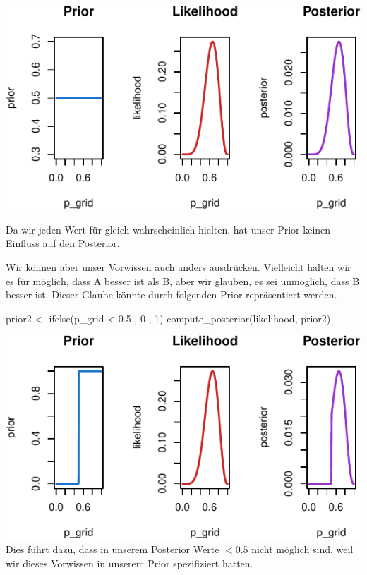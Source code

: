\documentclass[]{tufte-handout}
\newenvironment{Shaded}{}{}
\newcommand{\DecValTok}[1]{\textcolor[rgb]{0.25,0.63,0.44}{#1}}
\newcommand{\FloatTok}[1]{\textcolor[rgb]{0.25,0.63,0.44}{#1}}
\newcommand{\FunctionTok}[1]{\textcolor[rgb]{0.02,0.16,0.49}{#1}}
\newcommand{\NormalTok}[1]{#1}
\newcommand{\OtherTok}[1]{\textcolor[rgb]{0.00,0.44,0.13}{#1}}
\newcommand{\SpecialCharTok}[1]{\textcolor[rgb]{0.25,0.44,0.63}{#1}}
\begin{document}
\includegraphics{01-intro-bayesian-stats_files/figure-latex/unnamed-chunk-17-1}

Da wir jeden Wert für gleich wahrscheinlich hielten, hat unser Prior
keinen Einfluss auf den Posterior.

Wir können aber unser Vorwissen auch anders ausdrücken. Vielleicht
halten wir es für möglich, dass A besser ist als B, aber wir glauben, es
sei unmöglich, dass B besser ist. Dieser Glaube könnte durch folgenden
Prior repräsentiert werden.

\begin{Shaded}
\begin{Highlighting}[]
\NormalTok{prior2 }\OtherTok{\textless{}{-}} \FunctionTok{ifelse}\NormalTok{(p\_grid }\SpecialCharTok{\textless{}} \FloatTok{0.5}\NormalTok{ , }\DecValTok{0}\NormalTok{ , }\DecValTok{1}\NormalTok{)}
\FunctionTok{compute\_posterior}\NormalTok{(likelihood, prior2)}
\end{Highlighting}
\end{Shaded}

\includegraphics{01-intro-bayesian-stats_files/figure-latex/unnamed-chunk-18-1}
Dies führt dazu, dass in unserem Posterior Werte \(< 0.5\) nicht möglich
sind, weil wir dieses Vorwissen in unserem Prior spezifiziert hatten.
\end{document}

